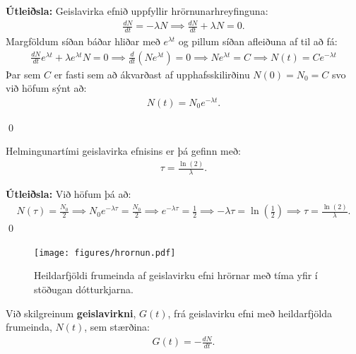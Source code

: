 \textbf{Útleiðsla:} Geislavirka efnið uppfyllir hrörnunarhreyfinguna:
\begin{align*}
    \frac{dN}{dt} = -\lambda N \implies \frac{dN}{dt} + \lambda N = 0.
\end{align*}
Margföldum síðan báðar hliðar með $e^{\lambda t}$ og pillum síðan afleiðuna af til að fá:
\begin{align*}
    \frac{dN}{dt}e^{\lambda t} + \lambda e^{\lambda t}N = 0 \implies \frac{d}{dt}\left( Ne^{\lambda t}  \right) = 0 \implies Ne^{\lambda t} = C \implies N(t) = Ce^{-\lambda t}
\end{align*}
Þar sem $C$ er fasti sem að ákvarðast af upphafsskilirðinu $N(0) = N_0 = C$ svo við höfum sýnt að:
\begin{align*}
    N(t) = N_0 e^{-\lambda t}.
\end{align*} 

\qed

\begin{tcolorbox}
\begin{theorem}
Helmingunartími geislavirka efnisins er þá gefinn með:
\begin{align*}
    \tau = \frac{\ln(2)}{\lambda}.
\end{align*}
\end{theorem}
\end{tcolorbox}

\textbf{Útleiðsla:} Við höfum þá að:
\begin{align*}
    N(\tau) = \frac{N_0}{2} \implies N_0e^{-\lambda \tau} =  \frac{N_0}{2} \implies e^{-\lambda \tau} = \frac{1}{2} \implies -\lambda \tau = \ln(\frac{1}{2}) \implies \tau = \frac{\ln(2)}{\lambda}.
\end{align*}
\qed


\begin{figure}[H]
    \centering
    \texttt{[image: figures/hrornun.pdf]}
    \caption{Heildarfjöldi frumeinda af geislavirku efni hrörnar með tíma yfir í stöðugan dótturkjarna.}
\end{figure}

\begin{tcolorbox}
\begin{definition}
Við skilgreinum \textbf{geislavirkni}, $G(t)$, frá geislavirku efni með heildarfjölda frumeinda, $N(t)$, sem stærðina:
\begin{align*}
    G(t) = -\frac{dN}{dt}.
\end{align*}
\end{definition}
\end{tcolorbox}

